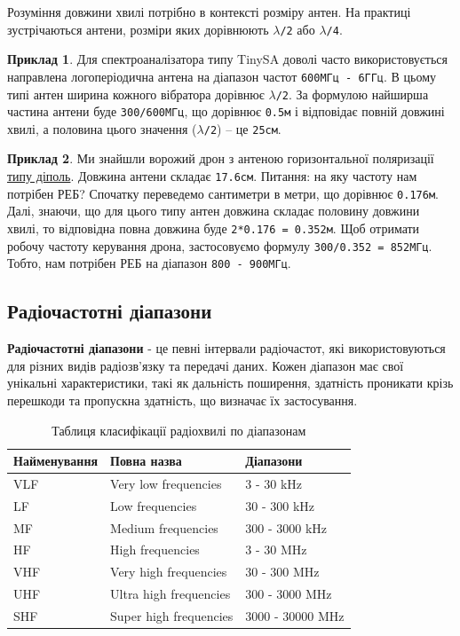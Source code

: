 \documentclass{article}
\begin{document}
Розуміння довжини хвилі потрібно в контексті розміру антен. На практиці зустрічаються антени, розміри яких дорівнюють \texttt{$\lambda$/2} або \texttt{$\lambda$/4}.

\textbf{Приклад 1}. Для спектроаналізатора типу TinySA доволі часто використовується направлена логоперіодична антена на діапазон частот \texttt{600МГц - 6ГГц}. В цьому типі антен ширина кожного вібратора дорівнює \texttt{$\lambda$/2}. За формулою найширша частина антени буде \texttt{300/600МГц}, що дорівнює \texttt{0.5м} і відповідає повній довжині хвилі, а половина цього значення (\texttt{$\lambda$/2}) -- це \texttt{25см}.

\textbf{Приклад 2}. Ми знайшли ворожий дрон з антеною горизонтальної поляризації \href{https://modelistam.com.ua/images/dl-ant-rx60.jpg}{типу діполь}. Довжина антени складає \texttt{17.6см}. Питання: на яку частоту нам потрібен РЕБ? Спочатку переведемо сантиметри в метри, що дорівнює \texttt{0.176м}. Далі, знаючи, що для цього типу антен довжина складає половину довжини хвилі, то відповідна повна довжина буде \texttt{2*0.176 = 0.352м}. Щоб отримати робочу частоту керування дрона, застосовуємо формулу \texttt{300/0.352 = 852МГц}. Тобто, нам потрібен РЕБ на діапазон \texttt{800 - 900МГц}.

\subsection{Радіочастотні діапазони}

\textbf{Радіочастотні діапазони} - це певні інтервали радіочастот, які використовуються для різних видів радіозв'язку та передачі даних. Кожен діапазон має свої унікальні характеристики, такі як дальність поширення, здатність проникати крізь перешкоди та пропускна здатність, що визначає їх застосування.

\begin{table}[ht]
	\centering
	\begin{tabular}{|l|l|l|}
		\hline 
		\textbf{Найменування}  & \textbf{Повна назва} & \textbf{Діапазони} \\
		\hline
		VLF      	& Very low frequencies		& 3 - 30 kHz   		\\
		LF    		& Low frequencies    		& 30 - 300 kHz 		\\
		MF			& Medium frequencies		& 300 - 3000 kHz	\\
		HF    		& High frequencies			& 3 - 30 MHz 		\\
		VHF     	& Very high frequencies 	& 30 - 300 MHz  	\\
		UHF			& Ultra high frequencies	& 300 - 3000 MHz	\\
		SHF			& Super high frequencies	& 3000 - 30000 MHz 	\\
		\hline
	\end{tabular}
	\caption{\label{table:radiowaves_types} Таблиця класифікації радіохвилі по діапазонам}
\end{table}
\end{document}
